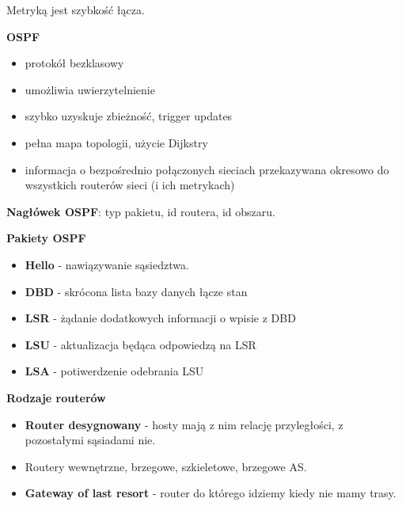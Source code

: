 \documentclass[../main.tex]{subfiles}
\begin{document}
    Metryką jest szybkość łącza.

    \textbf{OSPF}
    \begin{itemize}
        \item protokół bezklasowy
        \item umożliwia uwierzytelnienie
        \item szybko uzyskuje zbieżność, trigger updates
        \item pełna mapa topologii, użycie Dijkstry
        \item informacja o bezpośrednio połączonych sieciach przekazywana okresowo do wszystkich routerów sieci (i ich metrykach)
    \end{itemize}

    \textbf{Nagłówek OSPF}: typ pakietu, id routera, id obszaru.

    \textbf{Pakiety OSPF}
    \begin{itemize}
        \item \textbf{Hello} - nawiązywanie sąsiedztwa.
        \item \textbf{DBD} - skrócona lista bazy danych łącze stan
        \item \textbf{LSR} - żądanie dodatkowych informacji o wpisie z DBD
        \item \textbf{LSU} - aktualizacja będąca odpowiedzą na LSR
        \item \textbf{LSA} - potiwerdzenie odebrania LSU
    \end{itemize}


    \textbf{Rodzaje routerów}
    \begin{itemize}
        \item \textbf{Router desygnowany} - hosty mają z nim relację przyległości, z pozostałymi sąsiadami nie.
        \item Routery wewnętrzne, brzegowe, szkieletowe, brzegowe AS.
        \item \textbf{Gateway of last resort} - router do którego idziemy kiedy nie mamy trasy.
    \end{itemize}
\end{document}
